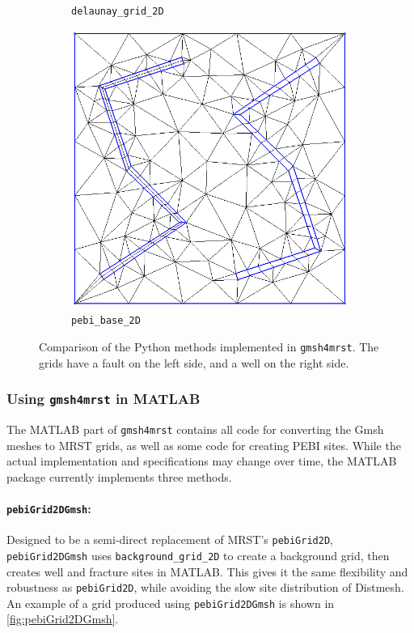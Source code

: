 \begin{figure}[p]
\begin{subfigure}[b]{0.49\textwidth}
        \caption{\texttt{delaunay\_grid\_2D}}
        \label{fig:delaunay_grid_2D}
    \end{subfigure}
    \begin{subfigure}[b]{0.49\textwidth}
        \centering
        \includegraphics[width=\textwidth]{report/Images/Combining software/Demo gmsh4mrst/demo_pebi_base_2D_lines.png}
        \caption{\texttt{pebi\_base\_2D}}
        \label{fig:pebi_base_2D}
    \end{subfigure}
    \caption[Comparison of the Python methods implemented in \texttt{gmsh4mrst}]{Comparison of the Python methods implemented in \texttt{gmsh4mrst}. The grids have a fault on the left side, and a well on the right side.}
    \label{fig:gmsh4mrst-pymethods}
\end{figure}

\subsubsection{Using \texttt{gmsh4mrst} in MATLAB}
The MATLAB part of \verb|gmsh4mrst| contains all code for converting the Gmsh meshes to MRST grids, as well as some code for creating PEBI sites. While the actual implementation and specifications may change over time, the MATLAB package currently implements three methods. 

\paragraph{\texttt{pebiGrid2DGmsh}:}
Designed to be a semi-direct replacement of MRST's \verb|pebiGrid2D|, \verb|pebiGrid2DGmsh| uses \verb|background_grid_2D| to create a background grid, then creates well and fracture sites in MATLAB. This gives it the same flexibility and robustness as \verb|pebiGrid2D|, while avoiding the slow site distribution of Distmesh. An example of a grid produced using \verb|pebiGrid2DGmsh| is shown in \autoref{fig:pebiGrid2DGmsh}.

